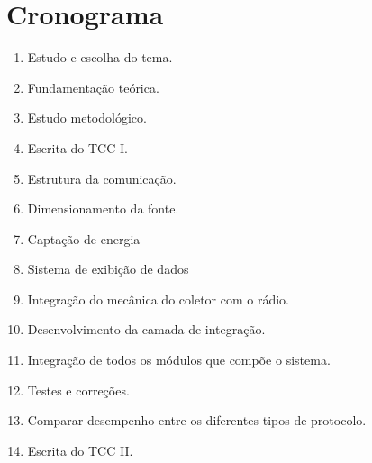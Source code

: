 \chapter{Cronograma}

\begin{enumerate}
	\item \label{escolhatema} Estudo e escolha do tema.
	\item \label{refteorico} Fundamentação teórica.
	\item \label{metodologia} Estudo metodológico.
	\item \label{esctcci} Escrita do TCC I.
	\item \label{comunica} Estrutura da comunicação.
	\item \label{fonte} Dimensionamento da fonte.
	\item \label{captacao} Captação de energia
	\item \label{exibicao} Sistema de exibição de dados 
	\item \label{integracaomec} Integração do mecânica do coletor com o rádio.
	\item \label{devapp} Desenvolvimento da camada de integração.
	\item \label{integracaosistema} Integração de todos os módulos que compõe o sistema.
	\item \label{testc} Testes e correções.
	\item \label{comapracoes} Comparar desempenho entre os diferentes tipos de protocolo.
	\item \label{esctccii} Escrita do TCC II.
\end{enumerate}

